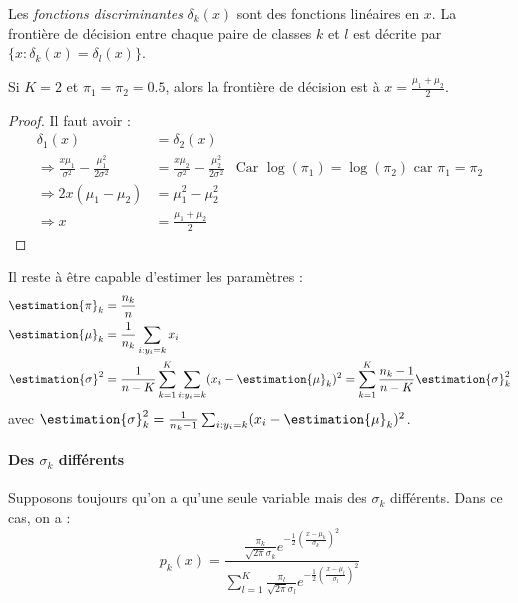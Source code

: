             Les \textit{fonctions discriminantes} \(\delta_k(x)\) sont des fonctions linéaires en \(x\). La frontière de décision entre chaque paire de classes \(k\) et \(l\) est décrite par \(\{x : \delta_k(x) = \delta_l(x)\}\).

            \begin{theorem}
                Si \(K = 2\) et \(\pi_1 = \pi_2 = 0.5\), alors la frontière de décision est à \(x = \frac{\mu_1 + \mu_2}{2}\).
            \end{theorem}
            \begin{proof}
                Il faut avoir :
                \begin{align*}
                    \delta_1(x) &= \delta_2(x)\\
                    \Rightarrow \frac{x\mu_1}{\sigma^2} - \frac{\mu_1^2}{2\sigma^2} &= \frac{x\mu_2}{\sigma^2} - \frac{\mu_2^2}{2\sigma^2} & \text{Car } \log(\pi_1) = \log(\pi_2) \text{ car } \pi_1 = \pi_2\\
                    \Rightarrow 2x(\mu_1 - \mu_2) &= \mu_1^2 - \mu_2^2\\
                    \Rightarrow x &= \frac{\mu_1 + \mu_2}{2}
                \end{align*}
            \end{proof}

            Il reste à être capable d'estimer les paramètres :
            \begin{align*}
                \estimation{\pi}_k &= \frac{n_k}{n}\\
                \estimation{\mu}_k &= \frac{1}{n_k} \sum_{i:y_i = k} x_i\\
                \estimation{\sigma}^2 &= \frac{1}{n - K} \sum_{k=1}^K \sum_{i:y_i = k} (x_i - \estimation{\mu}_k)^2 = \sum_{k=1}^K \frac{n_k - 1}{n - K} \estimation{\sigma}_k^2
            \end{align*}
            avec \(\estimation{\sigma}_k^2 = \frac{1}{n_k - 1}\sum_{i:y_i = k} (x_i - \estimation{\mu}_k)^2\).

        \paragraph{Des \(\sigma_k\) différents}
            Supposons toujours qu'on a qu'une seule variable mais des \(\sigma_k\) différents. Dans ce cas, on a :
            \[
                p_k(x) = \frac
                    {
                        \frac{\pi_k}{\sqrt{2\pi} \sigma_k} e^{-\frac{1}{2} (\frac{x - \mu_k}{\sigma_k})^2}
                    }
                    {
                        \sum_{l=1}^K \frac{\pi_l}{\sqrt{2\pi}\sigma_l} e^{-\frac{1}{2} (\frac{x - \mu_l}{\sigma_l})^2}
                    }
            \]

